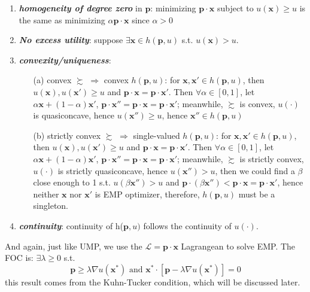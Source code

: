\begin{enumerate}
    \item \textit{\textbf{homogeneity of degree zero}} in $\mathbf{p}$: minimizing $\mathbf{p}\cdot\mathbf{x}$ subject to $u(\mathbf{x})\geq u$ is the same as minimizing $\alpha \mathbf{p}\cdot\mathbf{x}$ since $\alpha >0$
    \item \textit{\textbf{No excess utility}}: suppose $\exists \mathbf{x}\in h(\mathbf{p},u)$ s.t. $u(\mathbf{x})>u$. 
    \item \textit{\textbf{convexity/uniqueness}}:
    \begin{enumerate}
        \item[(a)] convex $\succsim$ $\Rightarrow$ convex $ h(\mathbf{p},u)$: for $\mathbf{x},\mathbf{x}'\in h(\mathbf{p},u)$, then $u(\mathbf{x}),u(\mathbf{x}')\geq u$ and $\mathbf{p}\cdot\mathbf{x}=\mathbf{p}\cdot\mathbf{x}'$. Then $\forall \alpha\in[0,1]$, let $\alpha\mathbf{x}+(1-\alpha)\mathbf{x}'$, $\mathbf{p}\cdot\mathbf{x}''=\mathbf{p}\cdot\mathbf{x}=\mathbf{p}\cdot\mathbf{x}'$; meanwhile, $\succsim$ is convex, $u(\cdot)$ is quasiconcave, hence $u(\mathbf{x}'')\geq u$, hence $\mathbf{x}''\in h(\mathbf{p},u)$
        \item[(b)] strictly convex $\succsim$ $\Rightarrow$ single-valued $ h(\mathbf{p},u)$: for $\mathbf{x},\mathbf{x}'\in h(\mathbf{p},u)$, then $u(\mathbf{x}),u(\mathbf{x}')\geq u$ and $\mathbf{p}\cdot\mathbf{x}=\mathbf{p}\cdot\mathbf{x}'$. Then $\forall \alpha\in[0,1]$, let $\alpha\mathbf{x}+(1-\alpha)\mathbf{x}'$, $\mathbf{p}\cdot\mathbf{x}''=\mathbf{p}\cdot\mathbf{x}=\mathbf{p}\cdot\mathbf{x}'$; meanwhile, $\succsim$ is strictly convex, $u(\cdot)$ is strictly quasiconcave, hence $u(\mathbf{x}'')> u$, then we could find a $\beta$ close enough to 1 s.t. $u(\beta\mathbf{x}'')>u$ and $\mathbf{p}\cdot(\beta \mathbf{x}'')<\mathbf{p}\cdot \mathbf{x}=\mathbf{p}\cdot \mathbf{x}'$, hence neither $\mathbf{x}$ nor $\mathbf{x}'$ is EMP optimizer, therefore, $h(\mathbf{p},u)$ must be a singleton.
    \end{enumerate}
    \item \textit\textbf{continuity}: continuity of h($\mathbf{p},u)$ follows the continuity of $u(\cdot)$.
\end{enumerate}

And again, just like UMP, we use the $\mathcal{L}=\mathbf{p}\cdot\mathbf{x}$ Lagrangean to solve EMP. The FOC is: $\exists \lambda \geq 0$ s.t.
$$\mathbf{p}\geq \lambda\nabla u(\mathbf{x}^*)\text{ and }\mathbf{x}^*\cdot[\mathbf{p}-\lambda \nabla u(\mathbf{x}^*)]=0$$
this result comes from the Kuhn-Tucker condition, which will be discussed later.

